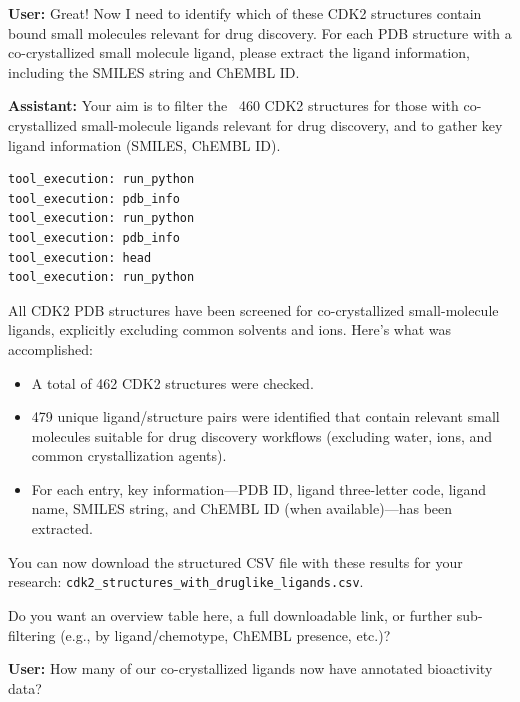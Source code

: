 \documentclass{article}
\begin{document}
\vspace{1.5em}

\begin{userbox}
\textbf{User:} Great! Now I need to identify which of these CDK2 structures contain bound small molecules relevant for drug discovery. For each PDB structure with a co-crystallized small molecule ligand, please extract the ligand information, including the SMILES string and ChEMBL ID.
\end{userbox}

\begin{assistantbox}
\textbf{Assistant:} Your aim is to filter the ~460 CDK2 structures for those with co-crystallized small-molecule ligands relevant for drug discovery, and to gather key ligand information (SMILES, ChEMBL ID).
\begin{verbatim}
tool_execution: run_python
tool_execution: pdb_info
tool_execution: run_python
tool_execution: pdb_info
tool_execution: head
tool_execution: run_python
\end{verbatim}
All CDK2 PDB structures have been screened for co-crystallized small-molecule ligands, explicitly excluding common solvents and ions. Here's what was accomplished:
\begin{itemize}
    \item A total of 462 CDK2 structures were checked.
    \item 479 unique ligand/structure pairs were identified that contain relevant small molecules suitable for drug discovery workflows (excluding water, ions, and common crystallization agents).
    \item For each entry, key information—PDB ID, ligand three-letter code, ligand name, SMILES string, and ChEMBL ID (when available)—has been extracted.
\end{itemize}
You can now download the structured CSV file with these results for your research: \texttt{cdk2\_structures\_with\_druglike\_ligands.csv}.

Do you want an overview table here, a full downloadable link, or further sub-filtering (e.g., by ligand/chemotype, ChEMBL presence, etc.)?
\end{assistantbox}

\vspace{1.5em}

\begin{userbox}
\textbf{User:} How many of our co-crystallized ligands now have annotated bioactivity data?
\end{userbox}
\end{document}
